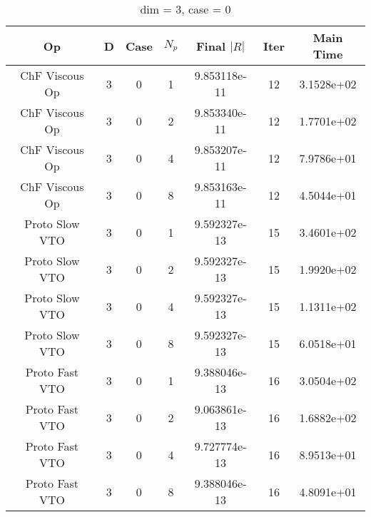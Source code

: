 \documentclass{article}
\begin{document}
\begin{small} 
  \begin{table} [p]
    \begin{center}
      \begin{tabular}{|c|c|c|c|c|c||c|} \hline
        Op & D & Case & $N_p$ & Final $|R|$  &  Iter & Main Time \\
        \hline

        ChF Viscous Op & 3 & 0 & 1& 9.853118e-11 & 12 & 3.1528e+02\\
        ChF Viscous Op & 3 & 0 & 2& 9.853340e-11 & 12 & 1.7701e+02\\
        ChF Viscous Op & 3 & 0 & 4& 9.853207e-11 & 12 & 7.9786e+01\\
        ChF Viscous Op & 3 & 0 & 8& 9.853163e-11 & 12 & 4.5044e+01\\
        Proto Slow VTO & 3 & 0 & 1& 9.592327e-13 & 15 & 3.4601e+02\\
        Proto Slow VTO & 3 & 0 & 2& 9.592327e-13 & 15 & 1.9920e+02\\
        Proto Slow VTO & 3 & 0 & 4& 9.592327e-13 & 15 & 1.1311e+02\\
        Proto Slow VTO & 3 & 0 & 8& 9.592327e-13 & 15 & 6.0518e+01\\
        Proto Fast VTO & 3 & 0 & 1& 9.388046e-13 & 16 & 3.0504e+02\\
        Proto Fast VTO & 3 & 0 & 2& 9.063861e-13 & 16 & 1.6882e+02\\
        Proto Fast VTO & 3 & 0 & 4& 9.727774e-13 & 16 & 8.9513e+01\\
        Proto Fast VTO & 3 & 0 & 8& 9.388046e-13 & 16 & 4.8091e+01\\
        \hline
      \end{tabular} 
    \end{center}   
    \label{__dim_=_3__case_=_0} 
    \caption{dim = 3, case = 0} 
  \end{table} 
\end{small}
\end{document}
